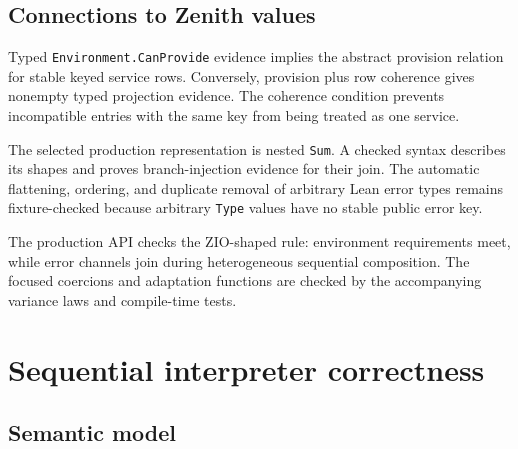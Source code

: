 \section{Connections to Zenith values}

\begin{theorem}
\label{thm:service-row-provision}
\leanok
Typed \texttt{Environment.CanProvide} evidence implies the abstract
provision relation for stable keyed service rows. Conversely, provision plus
row coherence gives nonempty typed projection evidence. The coherence
condition prevents incompatible entries with the same key from being treated
as one service.
\end{theorem}

\begin{theorem}
\label{thm:error-shape-injection}
\leanok
The selected production representation is nested \texttt{Sum}. A checked
syntax describes its shapes and proves branch-injection evidence for their
join. The automatic flattening, ordering, and duplicate removal of arbitrary
Lean error types remains fixture-checked because arbitrary \texttt{Type}
values have no stable public error key.
\end{theorem}

\begin{theorem}
\label{thm:effect-variance}
\leanok
The production API checks the ZIO-shaped rule: environment requirements meet,
while error channels join during heterogeneous sequential composition. The
focused coercions and adaptation functions are checked by the accompanying
variance laws and compile-time tests.
\end{theorem}

\chapter{Sequential interpreter correctness}

\section{Semantic model}


